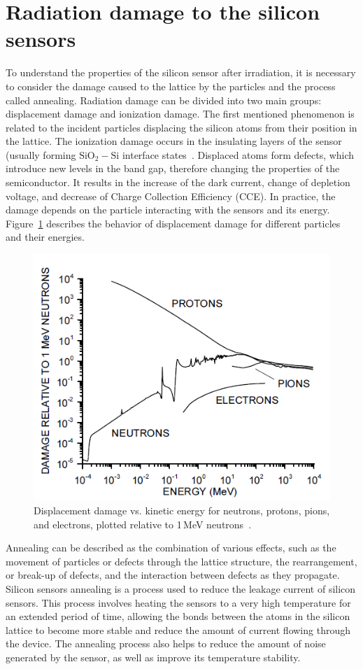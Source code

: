 \section{Radiation damage to the silicon sensors}
\label{silicon_damage}
To understand the properties of the silicon sensor after irradiation, it is necessary to consider the damage caused to the lattice by the particles and the process called annealing. Radiation damage can be divided into two main groups: displacement damage and ionization damage. The first mentioned phenomenon is related to the incident particles displacing the silicon atoms from their position in the lattice. The ionization damage occurs in the insulating layers of the sensor (usually forming $\mathrm{SiO_{2}-Si}$ interface states~\cite{Moll:1999kv}. Displaced atoms form defects, which introduce new levels in the band gap, therefore changing the properties of the semiconductor. It results in the increase of the dark current, change of depletion voltage, and decrease of Charge Collection Efficiency (\gls{CCE}). In practice, the damage depends on the particle interacting with the sensors and its energy. Figure~\ref{fig_niel_si} describes the behavior of displacement damage for different particles and their energies.  
\begin{figure}[!h]
\centering
\includegraphics[width=0.7\columnwidth]{Chapter2/images/displacement_damage.png}
\caption{Displacement damage vs. kinetic energy for neutrons, protons, pions, and electrons,
plotted relative to 1\,MeV neutrons~\cite{Spieler}.}
\label{fig_niel_si}
\end{figure}

Annealing can be described as the combination of various effects, such as the movement of particles or defects through the lattice structure, the rearrangement, or break-up of defects, and the interaction between defects as they propagate. Silicon sensors annealing is a process used to reduce the leakage current of silicon sensors. This process involves heating the sensors to a very high temperature for an extended period of time, allowing the bonds between the atoms in the silicon lattice to become more stable and reduce the amount of current flowing through the device. The annealing process also helps to reduce the amount of noise generated by the sensor, as well as improve its temperature stability. \bigbreak

